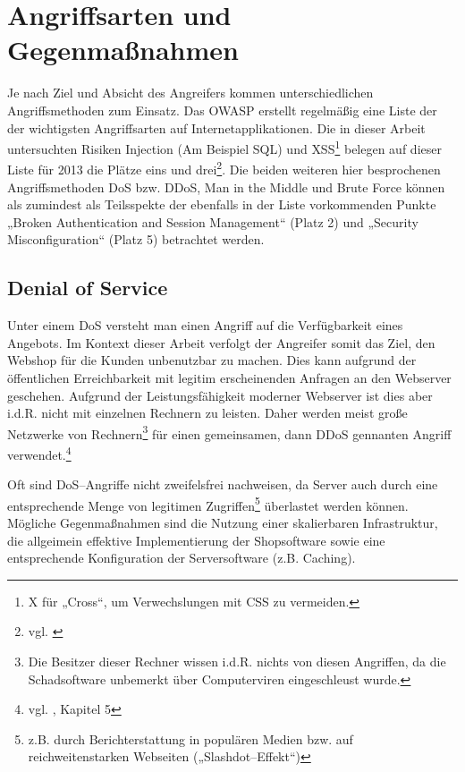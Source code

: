 \section{Angriffsarten und Gegenmaßnahmen}
\label{sec:hauptteil}

Je nach Ziel und Absicht des Angreifers kommen unterschiedlichen Angriffsmethoden zum Einsatz. Das \ac{OWASP} erstellt regelmäßig eine Liste der der wichtigsten Angriffsarten auf Internetapplikationen. Die in dieser Arbeit untersuchten Risiken Injection (Am Beispiel \ac{SQL}) und \acs{XSS}\footnote{X für „Cross“, um Verwechslungen mit \ac{CSS} zu vermeiden.} belegen auf dieser Liste für 2013 die Plätze eins und drei\footnote{vgl. \cite{owasp}}. Die beiden weiteren hier besprochenen Angriffsmethoden \ac{DoS} bzw. \ac{DDoS}, Man in the Middle und Brute Force können als zumindest als Teilsspekte der ebenfalls in der Liste vorkommenden Punkte „Broken Authentication and Session Management“ (Platz 2) und „Security Misconfiguration“ (Platz 5) betrachtet werden.

\subsection{Denial of Service}
\label{sec:dos}

Unter einem \ac{DoS} versteht man einen Angriff auf die Verfügbarkeit eines Angebots. Im Kontext dieser Arbeit verfolgt der Angreifer somit das Ziel, den Webshop für die Kunden unbenutzbar zu machen. Dies kann aufgrund der öffentlichen Erreichbarkeit mit legitim erscheinenden Anfragen an den Webserver geschehen. Aufgrund der Leistungsfähigkeit moderner Webserver ist dies aber i.d.R. nicht mit einzelnen Rechnern zu leisten. Daher werden meist große Netzwerke von Rechnern\footnote{Die Besitzer dieser Rechner wissen i.d.R. nichts von diesen Angriffen, da die Schadsoftware unbemerkt über Computerviren eingeschleust wurde.} für einen gemeinsamen, dann \ac{DDoS} gennanten Angriff verwendet.\footnote{vgl. \cite{carr}, Kapitel 5}

Oft sind \ac{DoS}--Angriffe nicht zweifelsfrei nachweisen, da Server auch durch eine entsprechende Menge von legitimen Zugriffen\footnote{z.B. durch Berichterstattung in populären Medien bzw. auf reichweitenstarken Webseiten („Slashdot--Effekt“)} überlastet werden können. Mögliche Gegenmaßnahmen sind die Nutzung einer skalierbaren Infrastruktur, die allgeimein effektive Implementierung der Shopsoftware sowie eine entsprechende Konfiguration der Serversoftware (z.B. Caching). 

